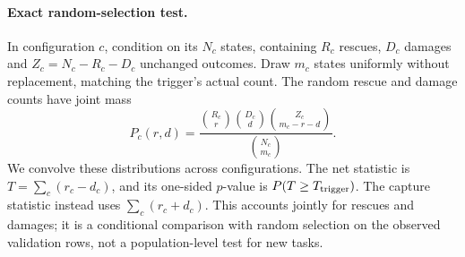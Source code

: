 \paragraph{Exact random-selection test.} In configuration $c$, condition on its $N_c$ states, containing $R_c$ rescues, $D_c$ damages and $Z_c=N_c-R_c-D_c$ unchanged outcomes. Draw $m_c$ states uniformly without replacement, matching the trigger's actual count. The random rescue and damage counts have joint mass
\[
 P_c(r,d)=\frac{\binom{R_c}{r}\binom{D_c}{d}\binom{Z_c}{m_c-r-d}}{\binom{N_c}{m_c}}.
\]
We convolve these distributions across configurations. The net statistic is $T=\sum_c(r_c-d_c)$, and its one-sided $p$-value is $P(T\ge T_{\rm trigger})$. The capture statistic instead uses $\sum_c(r_c+d_c)$. This accounts jointly for rescues and damages; it is a conditional comparison with random selection on the observed validation rows, not a population-level test for new tasks.
